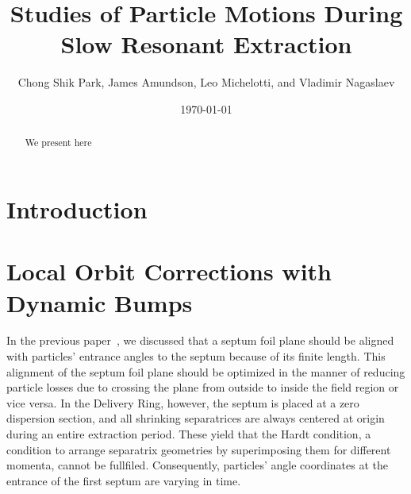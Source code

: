 \documentclass[aps,prstab,onecolumn,preprint,endfloats,11pt]{revtex4-1}
\begin{document}
\title{Studies of Particle Motions During Slow Resonant Extraction}
\author{Chong Shik Park, James Amundson, Leo Michelotti, and Vladimir Nagaslaev}
\date{\today}

\begin{abstract}
We present here 
\end{abstract}

\pacs{}
\maketitle

\setcounter{tocdepth}{5}


\section{\label{sec:intro}Introduction}

\clearpage

\section{\label{sec:bump}Local Orbit Corrections with Dynamic Bumps}

In the previous paper~\cite{mu2e}, we discussed that a septum foil plane should be aligned with particles' entrance angles to the septum because of its finite length.
This alignment of the septum foil plane should be optimized in the manner of reducing particle losses due to crossing the plane from outside to inside the field region or vice versa.
In the Delivery Ring, however, the septum is placed at a zero dispersion section, and all shrinking separatrices are always centered at origin during an entire extraction period.
These yield that the Hardt condition, a condition to arrange separatrix geometries by superimposing them for different momenta, cannot be fullfiled.
Consequently, particles' angle coordinates at the entrance of the first septum are varying in time.
\end{document}

